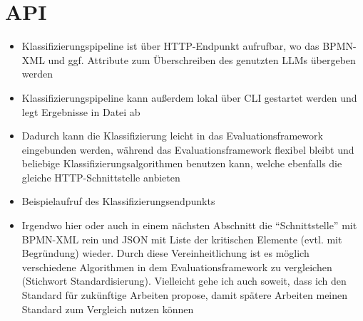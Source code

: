 \section{API}\label{sec:api}

\begin{itemize}
    \item Klassifizierungspipeline ist über HTTP-Endpunkt aufrufbar, wo das BPMN-XML und ggf. Attribute zum Überschreiben des genutzten LLMs übergeben werden
    \item Klassifizierungspipeline kann außerdem lokal über CLI gestartet werden und legt Ergebnisse in Datei ab
    \item Dadurch kann die Klassifizierung leicht in das Evaluationsframework eingebunden werden, während das Evaluationsframework flexibel bleibt und beliebige Klassifizierungsalgorithmen benutzen kann, welche ebenfalls die gleiche HTTP-Schnittstelle anbieten
    \item Beispielaufruf des Klassifizierungsendpunkts
    \item Irgendwo hier oder auch in einem nächsten Abschnitt die ``Schnittstelle'' mit BPMN-XML rein und JSON mit Liste der kritischen Elemente (evtl. mit Begründung) wieder. Durch diese Vereinheitlichung ist es möglich verschiedene Algorithmen in dem Evaluationsframework zu vergleichen (Stichwort Standardisierung). Vielleicht gehe ich auch soweit, dass ich den Standard für zukünftige Arbeiten propose, damit spätere Arbeiten meinen Standard zum Vergleich nutzen können
\end{itemize}